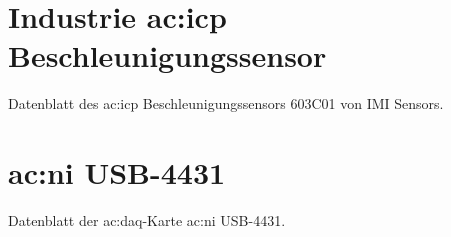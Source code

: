 %
%
\chapter{Industrie \acrshort{ac:icp} Beschleunigungssensor}\label{ch:indusriesensor}
    Datenblatt des \acrshort{ac:icp} Beschleunigungssensors 603C01 von IMI Sensors.
    
  
\chapter{\acrshort{ac:ni} USB-4431}\label{ch:niusb4431}
	Datenblatt der \gls{ac:daq}-Karte \acrshort{ac:ni} USB-4431.
	
  